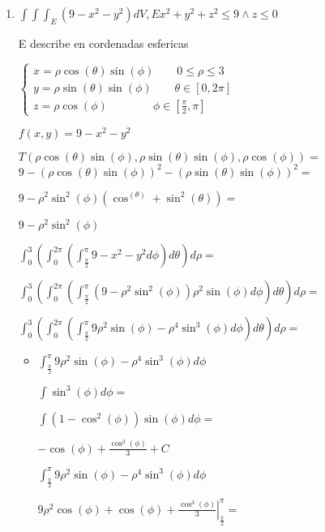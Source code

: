 \documentclass[../practica_09.tex]{subfiles}
\begin{document}
    \begin{enumerate}
        \item $\int \int \int_E (9-x^2-y^2) dV, E x^2+y^2+z^2 \leq 9 \wedge z \leq 0$
        
            E describe en cordenadas esfericas

            $\left \{\begin{array}{ll}
                x = \rho\cos(\theta)\sin(\phi) \qquad 0 \leq \rho \leq 3\\
                y = \rho\sin(\theta)\sin(\phi) \qquad \theta \in [0, 2\pi]\\
                z = \rho\cos(\phi) \qquad\qquad \phi \in [\frac{\pi}{2},\pi]
            \end{array} \right.$

            $f(x,y) = 9 - x^2 - y^2 $

            $T(\rho\cos(\theta)\sin(\phi), \rho\sin(\theta)\sin(\phi), \rho\cos(\phi)) =  $
            $ 9 - (\rho\cos(\theta)\sin(\phi))^2 - (\rho\sin(\theta)\sin(\phi))^2 =  $

            $ 9 - \rho^2\sin^2(\phi)(\cos^(\theta) + \sin^2(\theta)) = $

            $ 9 - \rho^2\sin^2(\phi) $

            $ \int_0^3 (\int_0^{2\pi} (\int_{\frac{\pi}{2}}^{\pi} 9 - x^2 - y^2 d\phi ) d\theta ) d\rho = $

            $ \int_0^3 (\int_0^{2\pi} (\int_{\frac{\pi}{2}}^{\pi} (9 - \rho^2\sin^2(\phi))\rho^2\sin(\phi) d\phi ) d\theta ) d\rho = $

            $ \int_0^3 (\int_0^{2\pi} (\int_{\frac{\pi}{2}}^{\pi} 9\rho^2\sin(\phi) - \rho^4\sin^3(\phi) d\phi) d\theta ) d\rho = $

            \begin{itemize}
                \item $\int_{\frac{\pi}{2}}^{\pi} 9\rho^2\sin(\phi) - \rho^4\sin^3(\phi) d\phi $

                    $ \int \sin^3(\phi) d\phi =$

                    $ \int (1-\cos^2(\phi))\sin(\phi) d\phi = $

                    $ -\cos(\phi) + \frac{\cos^3(\phi)}{3} + C $

                    $ \int_{\frac{\pi}{2}}^{\pi} 9\rho^2\sin(\phi) - \rho^4\sin^3(\phi) d\phi $

                    $ \left. 9\rho^2\cos(\phi) + \cos(\phi) + \frac{\cos^3(\phi)}{3}  \right |_{\frac{\pi}{2}}^{\pi} = $


\end{itemize}
\end{enumerate}
\end{document}
